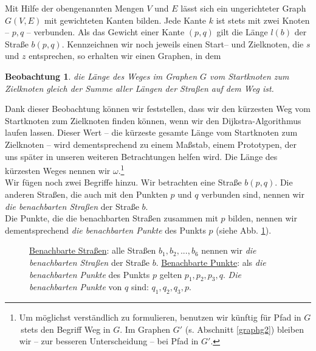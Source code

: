 \documentclass[a4paper,10pt,ngerman]{scrartcl}
\newtheorem{lemma}{Beobachtung}
\begin{document}
Mit Hilfe der obengenannten Mengen $V$ und $E$ lässt sich ein ungerichteter Graph $G(V, E)$
mit gewichteten Kanten bilden.
Jede Kante $k$ ist stets mit zwei Knoten -- $p,q$ -- verbunden.
Als das Gewicht einer Kante $(p, q)$ gilt die Länge $l(b)$ der Straße $b(p, q)$.
Kennzeichnen wir noch jeweils einen Start-- und Zielknoten, die $s$ und $z$ entsprechen,
so erhalten wir einen Graphen, in dem 
\begin{lemma}
die Länge des Weges im Graphen $G$ vom Startknoten zum Zielknoten gleich
der Summe aller Längen der Straßen auf dem Weg ist.
\end{lemma}
Dank dieser Beobachtung können wir feststellen,
dass wir den kürzesten Weg vom Startknoten zum Zielknoten finden können,
wenn wir den Dijkstra-Algorithmus laufen lassen.
Dieser Wert -- die kürzeste gesamte Länge vom Startknoten zum Zielknoten -- wird dementsprechend zu einem Maßstab, einem Prototypen,
der uns später in unseren weiteren Betrachtungen helfen wird. Die Länge des kürzesten Weges nennen wir $\omega$.\footnote{Um möglichst verständlich zu formulieren, benutzen wir künftig für 
\guillemotleft Pfad in $G$\guillemotright \,stets den Begriff \guillemotleft Weg in $G$\guillemotright.
Im Graphen $G'$ (s. Abschnitt \ref{graphg2}) bleiben wir -- zur besseren Unterscheidung -- bei \guillemotleft Pfad in $G'$\guillemotright.}\\

Wir fügen  noch zwei Begriffe hinzu. Wir betrachten eine Straße $b(p, q)$. 
Die anderen Straßen, die auch mit den Punkten $p$ und $q$ verbunden sind,
nennen wir \textit{die benachbarten Straßen} der Straße $b$.\\
Die Punkte, die die benachbarten Straßen zusammen mit $p$ bilden,
nennen wir dementsprechend \textit{die benachbarten Punkte} des Punkts $p$ (siehe Abb. \ref{benachbarte_Strassen}).\\

\begin{figure}[h] \centerline {
}
\caption{\underline{Benachbarte Straßen}: alle Straßen $b_1, b_2, ..., b_6$ nennen wir \textit{die benachbarten Straßen} der Straße $b$.
\underline{Benachbarte Punkte}: als \textit{die benachbarten Punkte} des Punkts $p$ gelten $p_1, p_2, p_3, q$.
\textit{Die benachbarten Punkte} von $q$ sind: $q_1, q_2, q_3, p$.}
\label{benachbarte_Strassen}
\end{figure}
\end{document}
